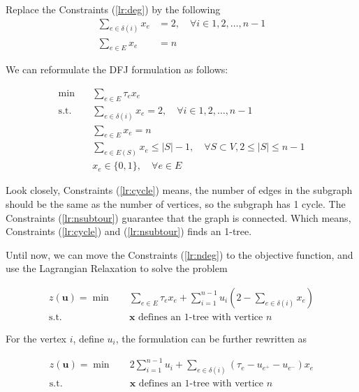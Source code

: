                 Replace the Constraints (\ref{lr:deg}) by the following
                \begin{align}
                    \sum_{e \in \delta(i)} x_e &= 2, \quad \forall i \in 1, 2, \ldots, n - 1\\
                    \sum_{e \in E} x_e &= n
                \end{align}

                We can reformulate the DFJ formulation as follows:

                \begin{align}
                    \min \quad &\sum_{e \in E} \tau_e x_e\\
                    \text{s.t.} \quad & \sum_{e \in \delta(i)} x_e = 2, \quad \forall i \in 1, 2, \ldots, n - 1\label{lr:ndeg}\\
                    &\sum_{e \in E} x_e = n \label{lr:cycle}\\
                    & \sum_{e \in E(S)} x_e \le |S| - 1, \quad \forall S \subset V, 2 \le |S| \le n - 1 \label{lr:nsubtour}\\
                    & x_e \in \{0, 1\}, \quad \forall e \in E
                \end{align}

                Look closely, Constraints (\ref{lr:cycle}) means, the number of edges in the subgraph should be the same as the number of vertices, so the subgraph has 1 cycle. The Constraints (\ref{lr:nsubtour}) guarantee that the graph is connected. Which means, Constraints (\ref{lr:cycle}) and (\ref{lr:nsubtour}) finds an 1-tree.

                Until now, we can move the Constraints (\ref{lr:ndeg}) to the objective function, and use the Lagrangian Relaxation to solve the problem

                \begin{align}
                    z(\mathbf{u}) = \min \quad & \sum_{e \in E} \tau_e x_e + \sum_{i = 1}^{n - 1}u_i(2 - \sum_{e \in \delta(i)} x_e)\\
                    \text{s.t.} \quad & \mathbf{x} \text{ defines an 1-tree with vertice } n
                \end{align}

                For the vertex $i$, define $u_i$, the formulation can be further rewritten as

                \begin{align}
                    z(\mathbf{u}) = \min \quad & 2\sum_{i = 1}^{n - 1} u_i + \sum_{e \in \delta(i)} (\tau_e - u_{e^+} - u_{e^-})x_e\\
                    \text{s.t.} \quad & \mathbf{x} \text{ defines an 1-tree with vertice } n
                \end{align}


